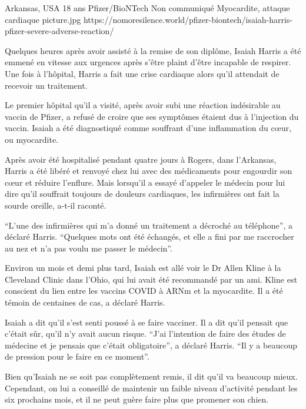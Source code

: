           {Arkansas, USA}
          {18 ans}
          {Pfizer/BioNTech}
          {Non communiqué}
          {Myocardite, attaque cardiaque}
          {picture.jpg}
          {https://nomoresilence.world/pfizer-biontech/isaiah-harris-pfizer-severe-adverse-reaction/}
          {
          
Quelques heures après avoir assisté à la remise de son diplôme, Isaiah Harris a
été emmené en vitesse aux urgences après s'être plaint d'être incapable de
respirer. Une fois à l'hôpital, Harris a fait une crise cardiaque alors qu'il
attendait de recevoir un traitement.

Le premier hôpital qu'il a visité, après avoir subi une réaction indésirable au
vaccin de Pfizer, a refusé de croire que ses symptômes étaient dus à l'injection
du vaccin. Isaiah a été diagnostiqué comme souffrant d'une inflammation du cœur,
ou myocardite.

Après avoir été hospitalisé pendant quatre jours à Rogers, dans l'Arkansas,
Harris a été libéré et renvoyé chez lui avec des médicaments pour engourdir son
cœur et réduire l'enflure. Mais lorsqu'il a essayé d'appeler le médecin pour lui
dire qu'il souffrait toujours de douleurs cardiaques, les infirmières ont fait
la sourde oreille, a-t-il raconté.

“L'une des infirmières qui m'a donné un traitement a décroché au téléphone”, a
déclaré Harris. “Quelques mots ont été échangés, et elle a fini par me
raccrocher au nez et n'a pas voulu me passer le médecin”.

Environ un mois et demi plus tard, Isaiah est allé voir le Dr Allen Kline à la
Cleveland Clinic dans l'Ohio, qui lui avait été recommandé par un ami. Kline est
conscient du lien entre les vaccins COVID à ARNm et la myocardite. Il a été
témoin de centaines de cas, a déclaré Harris.

Isaiah a dit qu'il s'est senti poussé à se faire vacciner. Il a dit qu'il
pensait que c'était sûr, qu'il n'y avait aucun risque. “J'ai l'intention de
faire des études de médecine et je pensais que c'était obligatoire”, a déclaré
Harris. “Il y a beaucoup de pression pour le faire en ce moment”.

Bien qu'Isaiah ne se soit pas complètement remis, il dit qu'il va beaucoup
mieux. Cependant, on lui a conseillé de maintenir un faible niveau d'activité
pendant les six prochains mois, et il ne peut guère faire plus que promener son
chien.

}
